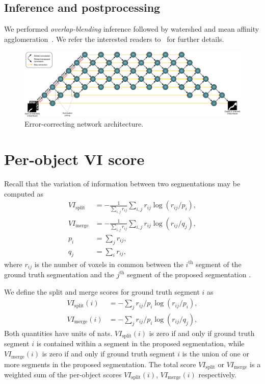 \documentclass{article}
\begin{document}
\subsection{Inference and postprocessing} We performed \emph{overlap-blending}
inference followed by watershed and mean affinity agglomeration~\cite{kisuk}. We
refer the interested readers to~\cite{kisuk} for further details.

\label{appendix:architecture}

\begin{figure}
\centering
\includegraphics[width=1.0\linewidth]{corrector.pdf}
\caption{Error-correcting network architecture.}
\label{fig:corrector}
\end{figure}

\section{Per-object VI score}
\label{appendix:vi}
 Recall that the variation of information between two segmentations may be computed as
\begin{align*}
	VI_\text{split}&=-\frac 1 {\sum_{i,j} r_{ij}} \sum_{i,j} r_{ij} \log(r_{ij}/p_i),\\
	VI_\text{merge}&=-\frac 1 {\sum_{i,j} r_{ij}} \sum_{i,j} r_{ij} \log(r_{ij}/q_j),\\
	p_i&=\sum_j r_{ij},\\
	q_j&=\sum_i r_{ij},
\end{align*}
where $r_{ij}$ is the number of voxels in common between the $i^\text{th}$ segment of the ground truth segmentation and the $j^\text{th}$ segment of the proposed segmentation \cite{vi}.

We define the split and merge scores for ground truth segment $i$ as
\begin{align*}
	VI_\text{split}(i) &= -\sum_j r_{ij}/p_i \log(r_{ij}/p_i),\\
	VI_\text{merge}(i) &= -\sum_j r_{ij}/p_i \log(r_{ij}/q_j),
\end{align*}
Both quantities have units of nats. $VI_\text{split}(i)$ is zero if and only if
ground truth segment $i$ is contained within a segment in the proposed
segmentation, while $VI_\text{merge}(i)$ is zero if and only if ground truth
segment $i$ is the union of one or more segments in the proposed segmentation.
The total score $VI_\text{split}$ or $VI_\text{merge}$ is a weighted sum of the
per-object scores $VI_\text{split}(i)$, $VI_\text{merge}(i)$ respectively.
\end{document}
